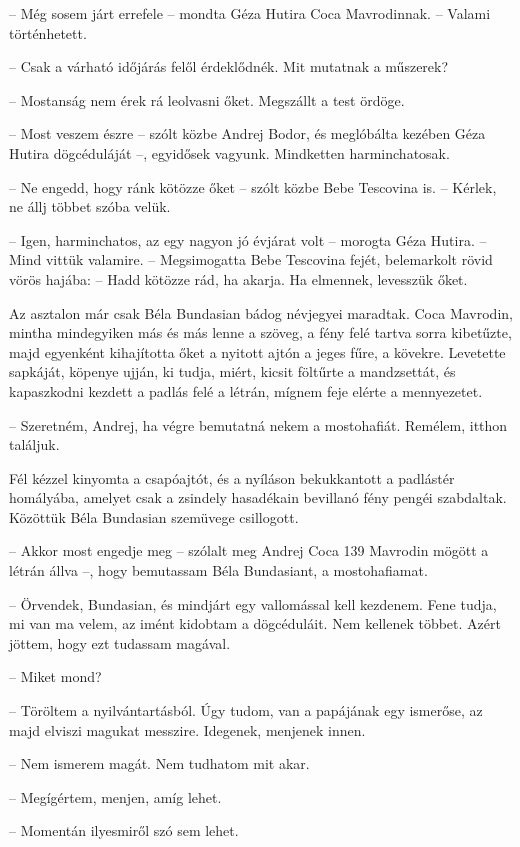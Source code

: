 \documentclass{IEEEtran}
\begin{document}
– Még sosem járt errefele – mondta Géza Hutira Coca Mavrodinnak. – Valami
történhetett.

– Csak a várható időjárás felől érdeklődnék. Mit mutatnak a műszerek?

– Mostanság nem érek rá leolvasni őket. Megszállt a test ördöge.

– Most veszem észre – szólt közbe Andrej Bodor, és meglóbálta kezében Géza
Hutira dögcéduláját –, egyidősek vagyunk. Mindketten harminchatosak.

– Ne engedd, hogy ránk kötözze őket – szólt közbe Bebe Tescovina is. – Kérlek,
ne állj többet szóba velük.

– Igen, harminchatos, az egy nagyon jó évjárat volt – morogta Géza Hutira. –
Mind vittük valamire. – Megsimogatta Bebe Tescovina fejét, belemarkolt rövid
vörös hajába: – Hadd kötözze rád, ha akarja. Ha elmennek, levesszük őket.

Az asztalon már csak Béla Bundasian bádog névjegyei maradtak. Coca Mavrodin,
mintha mindegyiken más és más lenne a szöveg, a fény felé tartva sorra
kibetűzte, majd egyenként kihajította őket a nyitott ajtón a jeges fűre, a
kövekre. Levetette sapkáját, köpenye ujján, ki tudja, miért, kicsit föltűrte a
mandzsettát, és kapaszkodni kezdett a padlás felé a létrán, mígnem feje elérte
a mennyezetet.

– Szeretném, Andrej, ha végre bemutatná nekem a mostohafiát. Remélem, itthon
találjuk.

Fél kézzel kinyomta a csapóajtót, és a nyíláson bekukkantott a padlástér
homályába, amelyet csak a zsindely hasadékain bevillanó fény pengéi
szabdaltak. Közöttük Béla Bundasian szemüvege csillogott.

– Akkor most engedje meg – szólalt meg Andrej Coca 139 Mavrodin mögött a létrán
állva –, hogy bemutassam Béla Bundasiant, a mostohafiamat.

– Örvendek, Bundasian, és mindjárt egy vallomással kell kezdenem. Fene tudja,
mi van ma velem, az imént kidobtam a dögcéduláit. Nem kellenek többet. Azért
jöttem, hogy ezt tudassam magával.

– Miket mond?

– Töröltem a nyilvántartásból. Úgy tudom, van a papájának egy ismerőse, az
majd elviszi magukat messzire. Idegenek, menjenek innen.

– Nem ismerem magát. Nem tudhatom mit akar.

– Megígértem, menjen, amíg lehet.

– Momentán ilyesmiről szó sem lehet.
\end{document}
